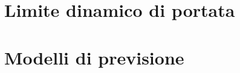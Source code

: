 \documentclass[fleqn,10pt]{SelfArx} %
\begin{document}
\section{Limite dinamico di portata}
\section{Modelli di previsione}\label{Mod}



\end{document}
